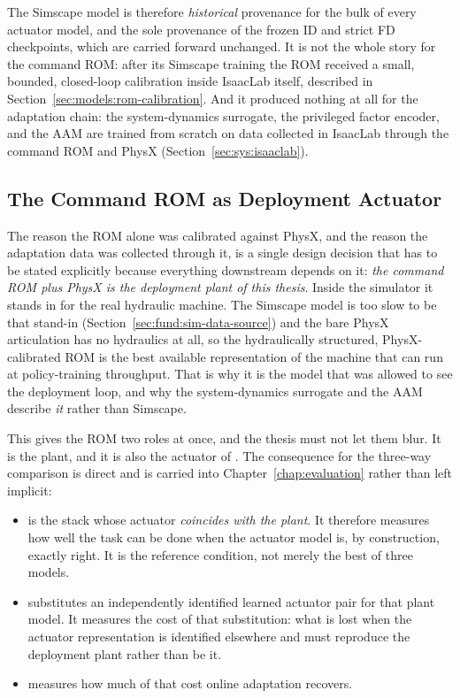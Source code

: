 The Simscape model is therefore \emph{historical} provenance for the
bulk of every actuator model, and the sole provenance of the frozen ID
and strict FD checkpoints, which are carried forward unchanged. It is
not the whole story for the command ROM: after its Simscape training the
ROM received a small, bounded, closed-loop calibration inside IsaacLab
itself, described in Section~\ref{sec:models:rom-calibration}. And it
produced nothing at all for the adaptation chain: the system-dynamics
surrogate, the privileged factor encoder, and the AAM are trained from
scratch on data collected in IsaacLab through the command ROM and PhysX
(Section~\ref{sec:sys:isaaclab}).

\subsection{The Command ROM as Deployment Actuator}
\label{sec:sys:rom-is-plant}

The reason the ROM alone was calibrated against PhysX, and the reason
the adaptation data was collected through it, is a single design
decision that has to be stated explicitly because everything downstream
depends on it: \emph{the command ROM plus PhysX is the deployment plant
of this thesis}. Inside the simulator it stands in for the real
hydraulic machine. The Simscape model is too slow to be that stand-in
(Section~\ref{sec:fund:sim-data-source}) and the bare PhysX articulation
has no hydraulics at all, so the hydraulically structured, PhysX-calibrated
ROM is the best available representation of the machine that can run at
policy-training throughput. That is why it is the model that was allowed
to see the deployment loop, and why the system-dynamics surrogate and
the AAM describe \emph{it} rather than Simscape.

This gives the ROM two roles at once, and the thesis must not let them
blur. It is the plant, and it is also the actuator of \ppoROM. The
consequence for the three-way comparison is direct and is carried into
Chapter~\ref{chap:evaluation} rather than left implicit:

\begin{itemize}
  \item \ppoROM{} is the stack whose actuator \emph{coincides with the
    plant}. It therefore measures how well the task can be done when the
    actuator model is, by construction, exactly right. It is the
    reference condition, not merely the best of three models.
  \item \ppoIDFD{} substitutes an independently identified learned
    actuator pair for that plant model. It measures the cost of that substitution: what is lost when the actuator representation is
    identified elsewhere and must reproduce the deployment plant rather
    than be it.
  \item \ppoIDAAMFD{} measures how much of that cost online adaptation
    recovers.
\end{itemize}

